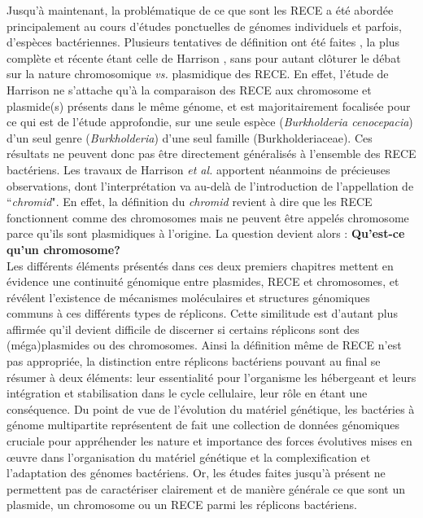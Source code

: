 Jusqu'à maintenant, la problématique de ce que sont les RECE a été abordée principalement au cours d'études ponctuelles de génomes individuels et parfois, d'espèces bactériennes. Plusieurs tentatives de définition ont été faites \citep{Mackenzie2004}, la plus complète et récente étant celle de Harrison \citep{harrison2011bacterial}, sans pour autant clôturer le débat sur la nature chromosomique \textit{vs.} plasmidique des RECE. En effet, l'étude de Harrison ne s'attache qu'à la comparaison des RECE aux chromosome et plasmide(s) présents dans le même génome, et est majoritairement focalisée pour ce qui est de l'étude approfondie, sur une seule espèce
 (\textit{Burkholderia cenocepacia}) d'un seul genre (\textit{Burkholderia}) d'une seul famille (Burkholderiaceae). Ces résultats ne peuvent donc pas être directement généralisés à l'ensemble des RECE bactériens. Les travaux de Harrison \textit{et al.} \citep{Harrison2010, harrison2011bacterial} apportent néanmoins de précieuses observations, dont l'interprétation va au-delà de l'introduction de l'appellation de ``\textit{chromid}". En effet, la définition du \textit{chromid} revient à dire que les RECE fonctionnent comme des chromosomes mais ne peuvent être appelés chromosome parce qu'ils sont plasmidiques à l'origine. La question devient alors : \textbf{Qu'est-ce qu'un chromosome?} \\
	Les différents éléments présentés dans ces deux premiers chapitres mettent en évidence une continuité génomique entre plasmides, RECE et chromosomes, et révélent l'existence de mécanismes moléculaires et structures génomiques communs à ces différents types de réplicons. Cette similitude est d'autant plus affirmée qu'il devient difficile de discerner si certains réplicons sont des (méga)plasmides ou des chromosomes. Ainsi la définition même de RECE n'est pas appropriée, la distinction entre réplicons bactériens pouvant au final se résumer à deux éléments: leur essentialité pour l'organisme les hébergeant et leurs intégration et stabilisation dans le cycle cellulaire, leur rôle en étant une conséquence. Du point de vue de l'évolution du matériel génétique, les bactéries à génome multipartite représentent de fait une collection de données génomiques cruciale pour appréhender les nature et importance des forces évolutives mises en œuvre dans l'organisation du matériel génétique et la complexification et l'adaptation des génomes bactériens. Or, les études faites jusqu'à présent ne permettent pas de caractériser clairement et de manière générale ce que sont un plasmide, un chromosome ou un RECE parmi les réplicons bactériens. \\
